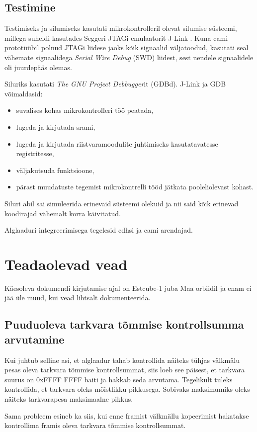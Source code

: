 \documentclass[12pt,a4paper]{article}
\begin{document}
\subsection{Testimine}
Testimiseks ja silumiseks kasutati mikrokontrolleril olevat silumise süsteemi,
millega suheldi kasutades Seggeri JTAGi \cite{jtag,jtagwiki} emulaatorit J-Link
\cite{jlink}. Kuna \gls{cam}i prototüübil polnud JTAGi liidese jaoks kõik
signaalid väljatoodud, kasutati seal vähemate signaalidega \textit{Serial Wire
Debug} (SWD) liidest, sest nendele signaalidele oli juurdepääs olemas.

Siluriks kasutati \textit{The GNU Project Debbugger}it (GDBd). J-Link ja GDB
võimaldasid:
\begin{itemize}
	\item suvalises kohas mikrokontrolleri töö peatada,
	\item lugeda ja kirjutada \gls{sram}i,
	\item lugeda ja kirjutada riistvaramoodulite juhtimiseks kasutatavatesse
		registritesse,
	\item väljakutsuda funktsioone,
	\item pärast muudatuste tegemist mikrokontrelli tööd jätkata pooleliolevast
		kohast.
\end{itemize}
Siluri abil sai simuleerida erinevaid süsteemi olekuid ja nii said kõik erinevad
koodirajad vähemalt korra käivitatud.

Alglaaduri integreerimisega tegelesid \gls{cdhs}i ja \gls{cam}i arendajad.

\section{Teadaolevad vead}
Käesoleva dokumendi kirjutamise ajal on Estcube-1 juba Maa orbiidil ja enam ei
jää üle muud, kui vead lihtsalt dokumenteerida.
\subsection{Puuduoleva tarkvara tõmmise kontrollsumma arvutamine}
Kui juhtub selline asi, et alglaadur tahab kontrollida näiteks tühjas välkmälu
pesas oleva tarkvara tõmmise kontrollsummat, siis loeb see päisest, et tarkvara
suurus on 0xFFFF FFFF baiti ja hakkab seda arvutama. Tegelikult tuleks
kontrollida, et tarkvara oleks mõistlikku pikkusega. Sobivaks maksimumiks oleks
näiteks tarkvarapesa maksimaalne pikkus.

Sama probleem esineb ka siis, kui enne \gls{fram}ist välkmällu kopeerimist hakatakse
kontrollima \gls{fram}is oleva tarkvara tõmmise kontrollsummat.
\end{document}
